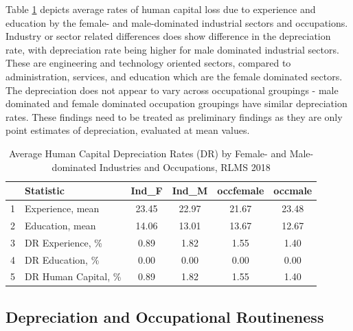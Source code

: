 \documentclass[alpha-refs]{wiley-article-02b}
\begin{document}
Table \ref{tab:3.3} depicts average rates of human capital loss due to experience and education by the female- and male-dominated industrial sectors and occupations. Industry or sector related differences does show difference in the depreciation rate, with depreciation rate being higher for male dominated industrial sectors. These are engineering and technology oriented sectors, compared to administration, services, and education which are the female dominated sectors. The depreciation does not appear to vary across occupational groupings - male dominated and female dominated occupation groupings have similar depreciation rates. These findings need to be treated as preliminary findings as they are only point estimates of depreciation, evaluated at mean values. 

\begin{table}[htbp!]
	\centering 
	\caption{Average Human Capital Depreciation Rates (DR) by Female- and Male-dominated Industries and Occupations, RLMS 2018} 
	\label{tab:3.3} 
	\begin{tabular}{clcccc}
		\hline
		& \textbf{Statistic} &\textbf{Ind\_F}& \textbf{Ind\_M} & \textbf{occfemale} & \textbf{occmale} \\ 
		\hline
		1 & Experience, mean  & 23.45 & 22.97 & 21.67 & 23.48 \\ 
		2 & Education, mean & 14.06 & 13.01 & 13.67 & 12.67 \\ 
		\midrule
		3 & DR Experience, \% & 0.89 & 1.82 & 1.55 & 1.40 \\ 
		4 & DR Education, \% & 0.00 & 0.00 & 0.00 & 0.00 \\ 
		5 & DR Human Capital, \% & 0.89 & 1.82 & 1.55 & 1.40 \\ 
		\hline
	\end{tabular}
\end{table} 


\subsection{Depreciation and Occupational Routineness}
\end{document}
